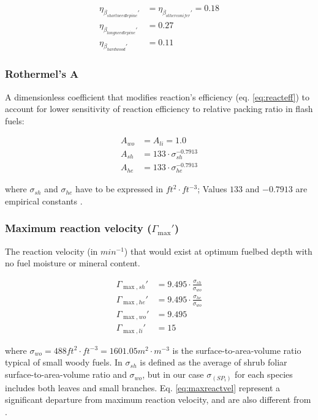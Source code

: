\documentclass[]{book}
\begin{document}
\begin{eqnarray}
\eta_{\beta_{shortneedlepine}'} &= \eta_{\beta_{otherconifer}'} = 0.18\\
\eta_{\beta_{longneedlepine}'} &= 0.27\\
\eta_{\beta_{hardwood}'} &= 0.11
\end{eqnarray}

\subsubsection{Rothermel's A}\label{rothermels-a}

A dimensionless coefficient that modifies reaction's efficiency (eq.
\eqref{eq:reacteff}) to account for lower sensitivity of reaction
efficiency to relative packing ratio in flash fuels:

\begin{eqnarray}
A_{wo} &= A_{li} = 1.0\\
A_{sh} &= 133\cdot \sigma_{sh}^{-0.7913}\\
A_{he} &= 133\cdot \sigma_{he}^{-0.7913}
\end{eqnarray}

where \(\sigma_{sh}\) and \(\sigma_{he}\) have to be expressed in
\(ft^2\cdot ft^{-3}\); Values \(133\) and \(-0.7913\) are empirical
constants \citep{Rothermel1972}.

\subsubsection{\texorpdfstring{Maximum reaction velocity
(\(\Gamma_{\max}'\))}{Maximum reaction velocity (\textbackslash{}Gamma\_\{\textbackslash{}max\}')}}\label{maximum-reaction-velocity-gamma_max}

The reaction velocity (in \(min^{-1}\)) that would exist at optimum
fuelbed depth with no fuel moisture or mineral content.

\begin{eqnarray}
\Gamma_{\max, sh}' &= 9.495 \cdot \frac{\sigma_{sh}}{\sigma_{wo}}\\
\Gamma_{\max, he}' &= 9.495 \cdot \frac{\sigma_{he}}{\sigma_{wo}}\\
\Gamma_{\max, wo}' &= 9.495 \\
\Gamma_{\max, li}' &= 15 
\label{eq:maxreactvel}
\end{eqnarray}

where \(\sigma_{wo} = 488 ft^2\cdot ft^{-3} = 1601.05 m^2\cdot m^{-3}\)
is the surface-to-area-volume ratio typical of small woody fuels. In
\citet{Prichard2013} \(\sigma_{sh}\) is defined as the average of shrub
foliar surface-to-area-volume ratio and \(\sigma_{wo}\), but in our case
\(\sigma_(SP_i)\) for each species includes both leaves and small
branches. Eq. \eqref{eq:maxreactvel} represent a significant departure
from \citet{Rothermel1972} maximum reaction velocity, and are also
different from \citet{Sandberg2007}.
\end{document}
